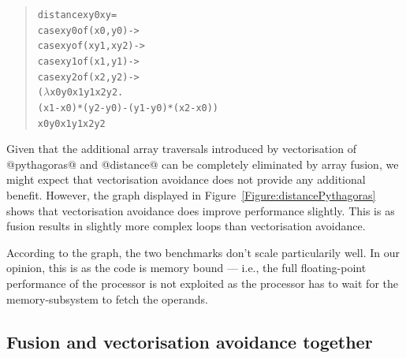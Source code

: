 %
\begin{quote}\small
\begin{alltt}
distance xy0 xy =
 case xy0 of (x0, y0) -> 
  case xy of (xy1, xy2) -> 
   case xy1 of (x1, y1) ->
    case xy2 of (x2, y2) -> 
     (\(\lambda\) x0 y0 x1 y1 x2 y2. 
       (x1 - x0) * (y2 - y0) - (y1 - y0) * (x2 - x0)) 
     x0 y0 x1 y1 x2 y2
\end{alltt}
\end{quote}
%
Given that the additional array traversals introduced by vectorisation of @pythagoras@ and @distance@ can be completely eliminated by array fusion, we might expect that vectorisation avoidance does not provide any additional benefit. However, the graph displayed in Figure~\ref{Figure:distancePythagoras} shows that vectorisation avoidance does improve performance slightly. This is as fusion results in slightly more complex loops than vectorisation avoidance.

According to the graph, the two benchmarks don't scale particularily well. In our opinion, this is as the code is memory bound --- i.e., the full floating-point performance of the processor is not exploited as the processor has to wait for the memory-subsystem to fetch the operands.

\subsection{Fusion and vectorisation avoidance together}

